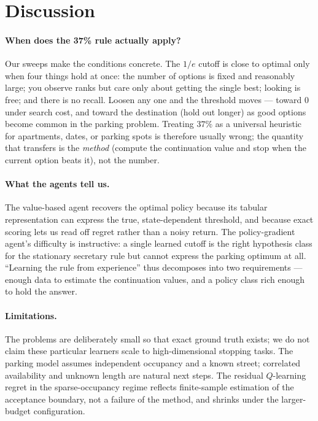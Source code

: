 \section{Discussion}
\paragraph{When does the 37\% rule actually apply?} Our sweeps make the
conditions concrete. The $1/e$ cutoff is close to optimal only when four things
hold at once: the number of options is fixed and reasonably large; you observe
ranks but care only about getting the single best; looking is free; and there is
no recall. Loosen any one and the threshold moves --- toward $0$ under search
cost, and toward the destination (hold out longer) as good options become
common in the parking problem. Treating $37\%$ as a universal heuristic for
apartments, dates, or parking spots is therefore usually wrong; the quantity
that transfers is the \emph{method} (compute the continuation value and stop
when the current option beats it), not the number.

\paragraph{What the agents tell us.} The value-based agent recovers the optimal
policy because its tabular representation can express the true, state-dependent
threshold, and because exact scoring lets us read off regret rather than a
noisy return. The policy-gradient agent's difficulty is instructive: a single
learned cutoff is the right hypothesis class for the stationary secretary rule
but cannot express the parking optimum at all. ``Learning the rule from
experience'' thus decomposes into two requirements --- enough data to estimate
the continuation values, and a policy class rich enough to hold the answer.

\paragraph{Limitations.} The problems are deliberately small so that exact
ground truth exists; we do not claim these particular learners scale to
high-dimensional stopping tasks. The parking model assumes independent
occupancy and a known street; correlated availability and unknown length are
natural next steps. The residual $Q$-learning regret in the sparse-occupancy
regime reflects finite-sample estimation of the acceptance boundary, not a
failure of the method, and shrinks under the larger-budget configuration.
